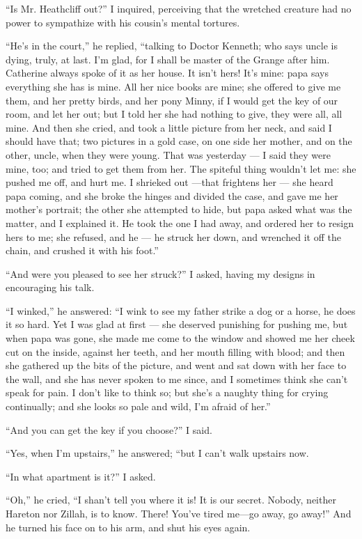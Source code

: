 \par “Is Mr. Heathcliff out?” I inquired, perceiving that the wretched creature had no power to sympathize with his cousin's mental tortures.
\par “He's in the court,” he replied, “talking to Doctor Kenneth; who says uncle is dying, truly, at last. I'm glad, for I shall be master of the Grange after him. Catherine always spoke of it as her house. It isn't hers! It's mine: papa says everything she has is mine. All her nice books are mine; she offered to give me them, and her pretty birds, and her pony Minny, if I would get the key of our room, and let her out; but I told her she had nothing to give, they were all, all mine. And then she cried, and took a little picture from her neck, and said I should have that; two pictures in a gold case, on one side her mother, and on the other, uncle, when they were young. That was yesterday — I said they were mine, too; and tried to get them from her. The spiteful thing wouldn't let me: she pushed me off, and hurt me. I shrieked out —that frightens her — she heard papa coming, and she broke the hinges and divided the case, and gave me her mother's portrait; the other she attempted to hide, but papa asked what was the matter, and I explained it. He took the one I had away, and ordered her to resign hers to me; she refused, and he — he struck her down, and wrenched it off the chain, and crushed it with his foot.”
\par “And were you pleased to see her struck?” I asked, having my designs in encouraging his talk.
\par “I winked,” he answered: “I wink to see my father strike a dog or a horse, he does it so hard. Yet I was glad at first — she deserved punishing for pushing me, but when papa was gone, she made me come to the window and showed me her cheek cut on the inside, against her teeth, and her mouth filling with blood; and then she gathered up the bits of the picture, and went and sat down with her face to the wall, and she has never spoken to me since, and I sometimes think she can't speak for pain. I don't like to think so; but she's a naughty thing for crying continually; and she looks so pale and wild, I'm afraid of her.”
\par “And you can get the key if you choose?” I said.
\par “Yes, when I'm upstairs,” he answered; “but I can't walk upstairs now.
\par “In what apartment is it?” I asked.
\par “Oh,” he cried, “I shan't tell you where it is! It is our secret. Nobody, neither Hareton nor Zillah, is to know. There! You've tired me—go away, go away!” And he turned his face on to his arm, and shut his eyes again.
